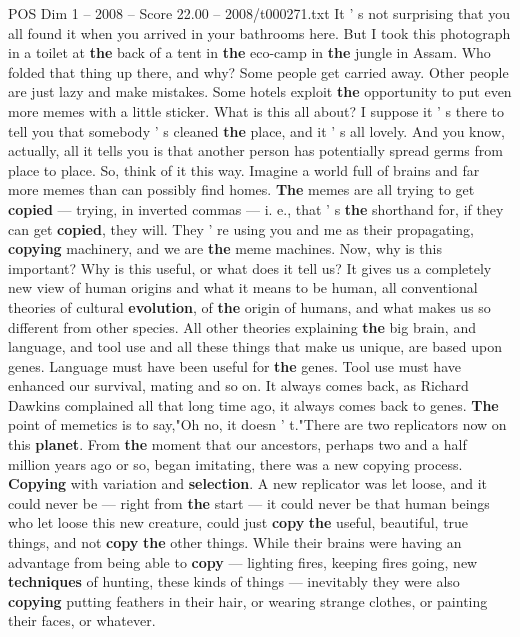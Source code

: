 \begin{textsample}{POS Dim 1 – 2008 – Score 22.00 – 2008/t000271.txt}
It ' s not surprising that you all found it when you arrived in your bathrooms here.
But I took this photograph in a toilet at \textbf{the} back of a tent in \textbf{the} eco-camp in \textbf{the} jungle in Assam.
Who folded that thing up there, and why?
Some people get carried away.
Other people are just lazy and make mistakes.
Some hotels exploit \textbf{the} opportunity to put even more memes with a little sticker.
What is this all about?
I suppose it ' s there to tell you that somebody ' s cleaned \textbf{the} place, and it ' s all lovely.
And you know, actually, all it tells you is that another person has potentially spread germs from place to place.
So, think of it this way.
Imagine a world full of brains and far more memes than can possibly find homes. \textbf{The} memes are all trying to get \textbf{copied} — trying, in inverted commas — i. e., that ' s \textbf{the} shorthand for, if they can get \textbf{copied}, they will.
They ' re using you and me as their propagating, \textbf{copying} machinery, and we are \textbf{the} meme machines.
Now, why is this important?
Why is this useful, or what does it tell us?
It gives us a completely new view of human origins and what it means to be human, all conventional theories of cultural \textbf{evolution}, of \textbf{the} origin of humans, and what makes us so different from other species.
All other theories explaining \textbf{the} big brain, and language, and tool use and all these things that make us unique, are based upon genes.
Language must have been useful for \textbf{the} genes.
Tool use must have enhanced our survival, mating and so on.
It always comes back, as Richard Dawkins complained all that long time ago, it always comes back to genes. \textbf{The} point of memetics is to say,"Oh no, it doesn ' t."There are two replicators now on this \textbf{planet}.
From \textbf{the} moment that our ancestors, perhaps two and a half million years ago or so, began imitating, there was a new copying process. \textbf{Copying} with variation and \textbf{selection}.
A new replicator was let loose, and it could never be — right from \textbf{the} start — it could never be that human beings who let loose this new creature, could just \textbf{copy} \textbf{the} useful, beautiful, true things, and not \textbf{copy} \textbf{the} other things.
While their brains were having an advantage from being able to \textbf{copy} — lighting fires, keeping fires going, new \textbf{techniques} of hunting, these kinds of things — inevitably they were also \textbf{copying} putting feathers in their hair, or wearing strange clothes, or painting their faces, or whatever.

\end{textsample}
